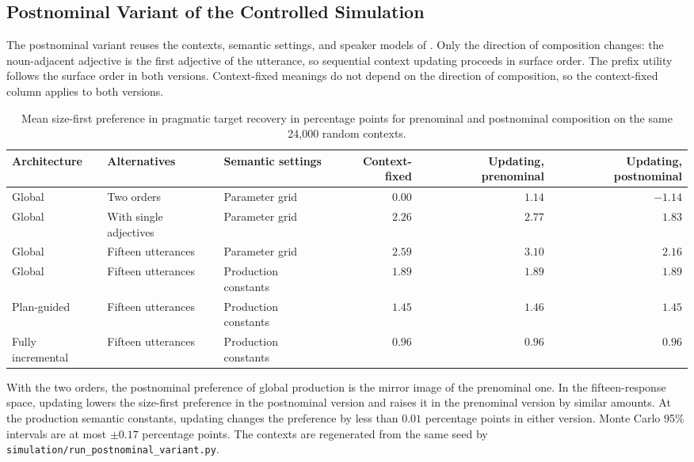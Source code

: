 \documentclass[10pt,a4paper,fleqn]{article}
\begin{document}
\FloatBarrier

\subsection{Postnominal Variant of the Controlled Simulation}
\label{sec:appendix:postnominal}

The postnominal variant reuses the contexts, semantic settings, and speaker models of .
Only the direction of composition changes: the noun-adjacent adjective is the first adjective of the utterance, so sequential context updating proceeds in surface order.
The prefix utility follows the surface order in both versions.
Context-fixed meanings do not depend on the direction of composition, so the context-fixed column applies to both versions.

\begin{table}[H]
  \centering
  \caption{Mean size-first preference in pragmatic target recovery in percentage points for prenominal and postnominal composition on the same 24{,}000 random contexts.}
  \label{tab:postnominal-simulation-means}
  \footnotesize
  \begin{tabularx}{\textwidth}{lXlrrr}
    \toprule
    Architecture & Alternatives & Semantic settings & Context-fixed & Updating, prenominal & Updating, postnominal \\
    \midrule
    Global & Two orders & Parameter grid & $0.00$ & $1.14$ & $-1.14$ \\
    Global & With single adjectives & Parameter grid & $2.26$ & $2.77$ & $1.83$ \\
    Global & Fifteen utterances & Parameter grid & $2.59$ & $3.10$ & $2.16$ \\
    Global & Fifteen utterances & Production constants & $1.89$ & $1.89$ & $1.89$ \\
    Plan-guided & Fifteen utterances & Production constants & $1.45$ & $1.46$ & $1.45$ \\
    Fully incremental & Fifteen utterances & Production constants & $0.96$ & $0.96$ & $0.96$ \\
    \bottomrule
  \end{tabularx}
\end{table}

With the two orders, the postnominal preference of global production is the mirror image of the prenominal one.
In the fifteen-response space, updating lowers the size-first preference in the postnominal version and raises it in the prenominal version by similar amounts.
At the production semantic constants, updating changes the preference by less than $0.01$ percentage points in either version.
Monte Carlo 95\% intervals are at most $\pm0.17$ percentage points.
The contexts are regenerated from the same seed by \texttt{simulation/run\_postnominal\_variant.py}.

\end{document}
